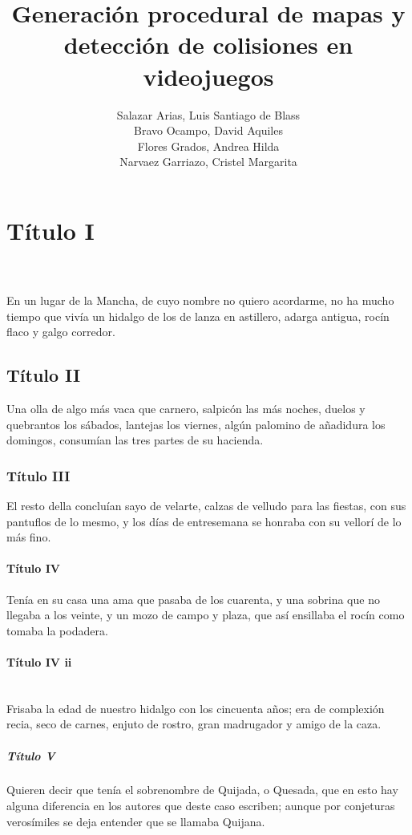 \documentclass[stu, 12pt, letterpaper, donotrepeattitle, floatsintext, natbib]{apa7}
\title{\Large Generación procedural de mapas y detección de colisiones en videojuegos}
\author{Salazar Arias, Luis Santiago de Blass \\Bravo Ocampo, David Aquiles \\ Flores Grados, Andrea Hilda\\ Narvaez Garriazo, Cristel Margarita} %
\affiliation{\Huge\textbf{Universidad San Ignacio de Loyola}}
\newcommand{\myparagraph}[1]{\paragraph{#1}\mbox{}\\}
\begin{document}
\maketitle


\renewcommand\contentsname{\largeÍndice}
\tableofcontents
\setcounter{tocdepth}{2}
\newpage
\renewcommand{\listfigurename}{\largeÍndice de fíguras}
\listoffigures
\newpage
\renewcommand{\listtablename}{\largeÍndice de tablas}
\listoftables
\newpage


\section{\large Título I}
\noindent {}\\
\noindent {}\\
En un lugar de la Mancha, de cuyo nombre no quiero acordarme, no ha mucho tiempo que vivía un hidalgo de los de lanza en astillero, adarga antigua, rocín flaco y galgo corredor.
\subsection{Título II} 
Una olla de algo más vaca que carnero, salpicón las más noches, duelos y quebrantos los sábados, lantejas los viernes, algún palomino de añadidura los domingos, consumían las tres partes de su hacienda.
\subsubsection{Título III}
El resto della concluían sayo de velarte, calzas de velludo para las fiestas, con sus pantuflos de lo mesmo, y los días de entresemana se honraba con su vellorí de lo más fino.
\paragraph{Título IV}
Tenía en su casa una ama que pasaba de los cuarenta, y una sobrina que no llegaba a los veinte, y un mozo de campo y plaza, que así ensillaba el rocín como tomaba la podadera.
\myparagraph{Título IV ii}
Frisaba la edad de nuestro hidalgo con los cincuenta años; era de complexión recia, seco de carnes, enjuto de rostro, gran madrugador y amigo de la caza. 
\subparagraph{Título V}
Quieren decir que tenía el sobrenombre de Quijada, o Quesada, que en esto hay alguna diferencia en los autores que deste caso escriben; aunque por conjeturas verosímiles se deja entender que se llamaba Quijana.

\newpage
\renewcommand\refname{\large\textbf{Referencias}}

\end{document}
